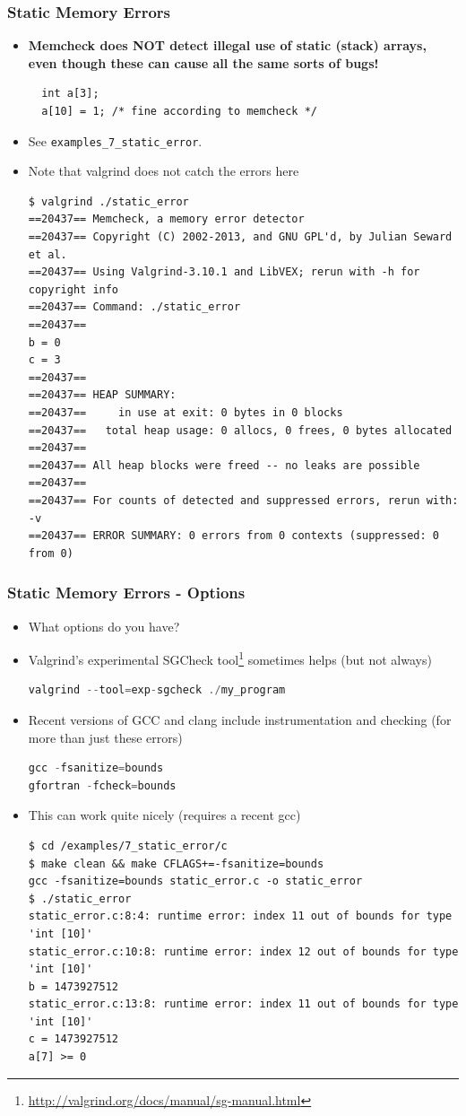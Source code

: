 \documentclass{beamer}
\begin{document}
\begin{frame}[fragile]
\frametitle{Static Memory Errors}
\begin{itemize}
\item \textbf{Memcheck does NOT detect illegal use of static (stack) arrays, even though these can cause all the same sorts of bugs!}
  \begin{lstlisting}
  int a[3];
  a[10] = 1; /* fine according to memcheck */
  \end{lstlisting}
\item See \texttt{examples\_7\_static\_error}. 
\item Note that valgrind does not catch the errors here
\begin{lstlisting}
$ valgrind ./static_error
==20437== Memcheck, a memory error detector
==20437== Copyright (C) 2002-2013, and GNU GPL'd, by Julian Seward et al.
==20437== Using Valgrind-3.10.1 and LibVEX; rerun with -h for copyright info
==20437== Command: ./static_error
==20437==
b = 0
c = 3
==20437==
==20437== HEAP SUMMARY:
==20437==     in use at exit: 0 bytes in 0 blocks
==20437==   total heap usage: 0 allocs, 0 frees, 0 bytes allocated
==20437==
==20437== All heap blocks were freed -- no leaks are possible
==20437==
==20437== For counts of detected and suppressed errors, rerun with: -v
==20437== ERROR SUMMARY: 0 errors from 0 contexts (suppressed: 0 from 0)
\end{lstlisting}
\end{itemize}
\end{frame}

\begin{frame}[fragile]
\frametitle{Static Memory Errors - Options}
\begin{itemize}
\item What options do you have?
\item Valgrind's experimental SGCheck tool\footnote{\url{http://valgrind.org/docs/manual/sg-manual.html}} sometimes helps (but not always)
\begin{lstlisting}[language=C++]
valgrind --tool=exp-sgcheck ./my_program
\end{lstlisting}
\item Recent versions of GCC and clang include instrumentation and checking (for more than just these errors)
\begin{lstlisting}[language=C++]
gcc -fsanitize=bounds
gfortran -fcheck=bounds
\end{lstlisting}
\item This can work quite nicely (requires a recent gcc)
\begin{lstlisting}
$ cd /examples/7_static_error/c
$ make clean && make CFLAGS+=-fsanitize=bounds
gcc -fsanitize=bounds static_error.c -o static_error
$ ./static_error
static_error.c:8:4: runtime error: index 11 out of bounds for type 'int [10]'
static_error.c:10:8: runtime error: index 12 out of bounds for type 'int [10]'
b = 1473927512
static_error.c:13:8: runtime error: index 11 out of bounds for type 'int [10]'
c = 1473927512
a[7] >= 0
\end{lstlisting}
\end{itemize}
\end{frame}
\end{document}
